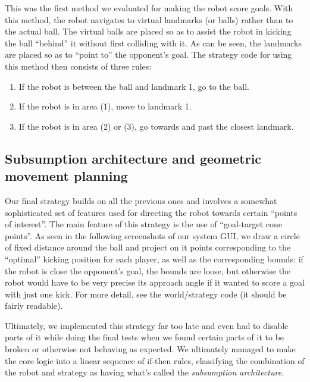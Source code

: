 \documentclass[12pt,a4paper,notitlepage,twocolumn]{report}
\begin{document}
This was the first method we evaluated for making the robot score
goals. With this method, the robot navigates to virtual landmarks (or
balls) rather than to the actual ball. The virtual balls are placed so
as to assist the robot in kicking the ball “behind” it without first
colliding with it. As can be seen, the landmarks are placed so as to
“point to” the opponent’s goal. The strategy code for using this
method then consists of three rules:
\begin{enumerate}
\item If the robot is between the ball and landmark 1, go to the ball.
\item If the robot is in area (1), move to landmark 1.
\item If the robot is in area (2) or (3), go towards and past the
  closest landmark.
\end{enumerate}

\subsection*{Subsumption architecture and geometric movement planning}
Our final strategy builds on all the previous ones and involves a
somewhat sophisticated set of features used for directing the robot
towards certain “points of interest”. The main feature of this
strategy is the use of “goal-target cone points”. As seen in the
following screenshots of our system GUI, we draw a circle of fixed
distance around the ball and project on it points corresponding to the
“optimal” kicking position for each player, as well as the
corresponding bounds: if the robot is close the opponent’s goal, the
bounds are loose, but otherwise the robot would have to be very
precise its approach angle if it wanted to score a goal with just one
kick. For more detail, see the world/strategy code (it should be
fairly readable).

Ultimately, we implemented this strategy far too late and even had to
disable parts of it while doing the final tests when we found certain
parts of it to be broken or otherwise not behaving as expected. We
ultimately managed to make the core logic into a linear sequence of
if-then rules, classifying the combination of the robot and strategy
as having what’s called the \emph{subsumption architecture}.
\end{document}
